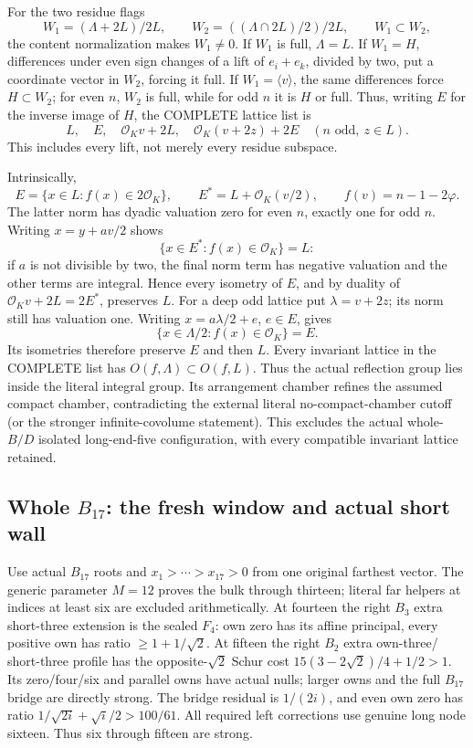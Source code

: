 For the two residue flags
\[
 W_1=(\Lambda+2L)/2L,\qquad
 W_2=((\Lambda\cap2L)/2)/2L,\qquad W_1\subset W_2,
\]
the content normalization makes \(W_1\ne0\).
If \(W_1\) is full, \(\Lambda=L\).
If \(W_1=H\), differences under even sign
changes of a lift of \(e_i+e_k\), divided by two,
put a coordinate vector in \(W_2\), forcing it full.
If \(W_1=\langle v\rangle\), the same differences
force \(H\subset W_2\); for even \(n\), \(W_2\)
is full, while for odd \(n\) it is \(H\) or full.
Thus, writing \(E\) for the inverse image of \(H\),
the COMPLETE lattice list is
\[
           L,\quad E,\quad\mathcal O_Kv+2L,\quad
           \mathcal O_K(v+2z)+2E\quad(n\text{ odd},\ z\in L).
\]
This includes every lift, not merely every residue
subspace.

Intrinsically,
\[
 E=\{x\in L:f(x)\in2\mathcal O_K\},\qquad
 E^*=L+\mathcal O_K(v/2),\qquad
 f(v)=n-1-2\varphi.
\]
The latter norm has dyadic valuation zero for even
\(n\), exactly one for odd \(n\).
Writing \(x=y+av/2\) shows
\[
                     \{x\in E^*:f(x)\in\mathcal O_K\}=L:
\]
if \(a\) is not divisible by two, the final
norm term has negative valuation and the other
terms are integral.
Hence every isometry of \(E\), and by duality of
\(\mathcal O_Kv+2L=2E^*\), preserves \(L\).
For a deep odd lattice put \(\lambda=v+2z\);
its norm still has valuation one.
Writing \(x=a\lambda/2+e\), \(e\in E\), gives
\[
                     \{x\in\Lambda/2:f(x)\in\mathcal O_K\}=E .
\]
Its isometries therefore preserve \(E\) and then \(L\).
Every invariant lattice in the COMPLETE list has
\(O(f,\Lambda)\subset O(f,L)\).
Thus the actual reflection group lies inside the
literal integral group.
Its arrangement chamber refines the assumed
compact chamber, contradicting the external
literal no-compact-chamber cutoff
(or the stronger infinite-covolume statement).
This excludes the actual whole-\(B/D\) isolated
long-end-five configuration, with every compatible
invariant lattice retained.

\subsection{Whole \(B_{17}\): the fresh window and actual short wall}
\label{app:arithB17physical}

Use actual \(B_{17}\) roots and
\(x_1>\cdots>x_{17}>0\) from one original
farthest vector.
The generic parameter \(M=12\) proves the bulk
through thirteen; literal far helpers at indices
at least six are excluded arithmetically.
At fourteen the right \(B_3\) extra short-three
extension is the sealed \(F_4\): own zero has
its affine principal, every positive own has
ratio \(\ge1+1/\sqrt2\).
At fifteen the right \(B_2\) extra own-three/
short-three profile has the opposite-\(\sqrt2\)
Schur cost
\(15(3-2\sqrt2)/4+1/2>1\).
Its zero/four/six and parallel owns have actual
nulls; larger owns and the full \(B_{17}\)
bridge are directly strong.
The bridge residual is \(1/(2i)\), and even
own zero has ratio
\(1/\sqrt{2i}+\sqrt i/2>100/61\).
All required left corrections use genuine
long node sixteen.
Thus six through fifteen are strong.

